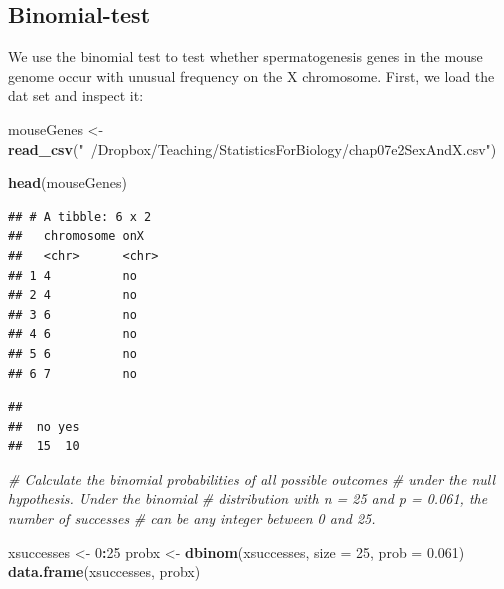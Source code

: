 \documentclass[]{article}
\newenvironment{Shaded}{\begin{snugshade}}{\end{snugshade}}
\newcommand{\CommentTok}[1]{\textcolor[rgb]{0.56,0.35,0.01}{\textit{#1}}}
\newcommand{\DataTypeTok}[1]{\textcolor[rgb]{0.13,0.29,0.53}{#1}}
\newcommand{\DecValTok}[1]{\textcolor[rgb]{0.00,0.00,0.81}{#1}}
\newcommand{\FloatTok}[1]{\textcolor[rgb]{0.00,0.00,0.81}{#1}}
\newcommand{\KeywordTok}[1]{\textcolor[rgb]{0.13,0.29,0.53}{\textbf{#1}}}
\newcommand{\NormalTok}[1]{#1}
\newcommand{\OperatorTok}[1]{\textcolor[rgb]{0.81,0.36,0.00}{\textbf{#1}}}
\newcommand{\StringTok}[1]{\textcolor[rgb]{0.31,0.60,0.02}{#1}}
\begin{document}
\hypertarget{binomial-test}{%
\subsection{Binomial-test}\label{binomial-test}}

We use the binomial test to test whether spermatogenesis genes in the
mouse genome occur with unusual frequency on the X chromosome. First, we
load the dat set and inspect it:

\begin{Shaded}
\begin{Highlighting}[]
\NormalTok{mouseGenes <-}\StringTok{ }\KeywordTok{read_csv}\NormalTok{(}\StringTok{"~/Dropbox/Teaching/StatisticsForBiology/chap07e2SexAndX.csv"}\NormalTok{)}

\KeywordTok{head}\NormalTok{(mouseGenes)}
\end{Highlighting}
\end{Shaded}

\begin{verbatim}
## # A tibble: 6 x 2
##   chromosome onX  
##   <chr>      <chr>
## 1 4          no   
## 2 4          no   
## 3 6          no   
## 4 6          no   
## 5 6          no   
## 6 7          no
\end{verbatim}

\begin{Shaded}
\end{Shaded}

\begin{verbatim}
## 
##  no yes 
##  15  10
\end{verbatim}

\begin{Shaded}
\begin{Highlighting}[]
\CommentTok{# Calculate the binomial probabilities of all possible outcomes}
\CommentTok{# under the null hypothesis. Under the binomial}
\CommentTok{# distribution with n = 25 and p = 0.061, the number of successes}
\CommentTok{# can be any integer between 0 and 25.}

\NormalTok{xsuccesses <-}\StringTok{ }\DecValTok{0}\OperatorTok{:}\DecValTok{25}
\NormalTok{probx <-}\StringTok{ }\KeywordTok{dbinom}\NormalTok{(xsuccesses, }\DataTypeTok{size =} \DecValTok{25}\NormalTok{, }\DataTypeTok{prob =} \FloatTok{0.061}\NormalTok{)}
\KeywordTok{data.frame}\NormalTok{(xsuccesses, probx)}
\end{Highlighting}
\end{Shaded}
\end{document}
